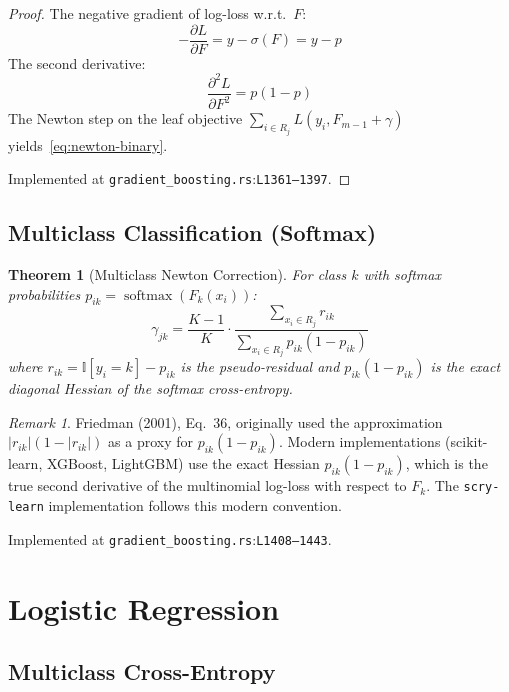 \documentclass[11pt,a4paper]{article}
\newtheorem{theorem}{Theorem}[section]
\theoremstyle{remark}
\newtheorem{remark}{Remark}[section]
\newcommand{\coderef}[2]{\texttt{#1}:\texttt{L#2}}
\newcommand{\II}{\mathbb{I}}
\newcommand{\softmax}{\operatorname{softmax}}
\begin{document}
\begin{proof}
The negative gradient of log-loss w.r.t.\ $F$:
\[
  -\frac{\partial L}{\partial F} = y - \sigma(F) = y - p
\]
The second derivative:
\[
  \frac{\partial^2 L}{\partial F^2} = p(1 - p)
\]
The Newton step on the leaf objective $\sum_{i \in R_j} L(y_i, F_{m-1} + \gamma)$
yields~\eqref{eq:newton-binary}.

Implemented at \coderef{gradient\_boosting.rs}{1361--1397}. \checkmark
\end{proof}

\subsection{Multiclass Classification (Softmax)}

\begin{theorem}[Multiclass Newton Correction]
\label{thm:newton-multi}
For class $k$ with softmax probabilities $p_{ik} = \softmax(F_k(x_i))$:
\begin{equation}
  \gamma_{jk} = \frac{K-1}{K} \cdot
    \frac{\sum_{x_i \in R_j} r_{ik}}{\sum_{x_i \in R_j} p_{ik}(1 - p_{ik})}
  \label{eq:newton-multi}
\end{equation}
where $r_{ik} = \II[y_i = k] - p_{ik}$ is the pseudo-residual and
$p_{ik}(1 - p_{ik})$ is the exact diagonal Hessian of the softmax cross-entropy.
\end{theorem}

\begin{remark}
Friedman (2001), Eq.~36, originally used the approximation
$|r_{ik}|(1 - |r_{ik}|)$ as a proxy for $p_{ik}(1 - p_{ik})$.
Modern implementations (scikit-learn, XGBoost, LightGBM) use the exact
Hessian $p_{ik}(1 - p_{ik})$, which is the true second derivative of the
multinomial log-loss with respect to $F_k$.  The \texttt{scry-learn}
implementation follows this modern convention.
\end{remark}

Implemented at \coderef{gradient\_boosting.rs}{1408--1443}. \checkmark

\section{Logistic Regression}
\label{sec:logreg}

\subsection{Multiclass Cross-Entropy}
\end{document}

